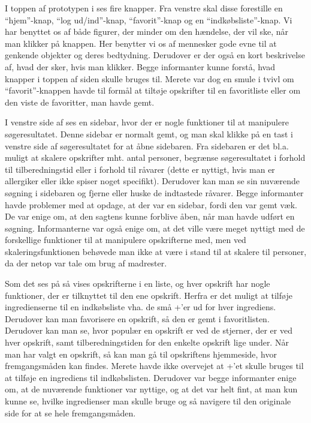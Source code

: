 I toppen af prototypen i  ses fire knapper. Fra venstre skal disse forestille en ``hjem''-knap, ``log ud/ind''-knap, ``favorit''-knap og en ``indkøbsliste''-knap. Vi har benyttet os af både figurer, der minder om den hændelse, der vil ske, når man klikker på knappen. Her benytter vi os af mennesker gode evne til at genkende objekter og deres bedtydning.\cite[p. ~340]{deb} Derudover er der også en kort beskrivelse af, hvad der sker, hvis man klikker. Begge informanter kunne forstå, hvad knapper i toppen af siden skulle bruges til. Merete var dog en smule i tvivl om ``favorit''-knappen havde til formål at tiltøje opskrifter til en favoritliste eller om den viste de favoritter, man havde gemt.

I venstre side af  ses en sidebar, hvor der er nogle funktioner til at manipulere søgeresultatet. Denne sidebar er normalt gemt, og man skal klikke på en tast i venstre side af søgeresultatet for at åbne sidebaren. Fra sidebaren er det bl.a. muligt at skalere opskrifter mht. antal personer, begrænse søgeresultatet i forhold til tilberedningstid eller i forhold til råvarer (dette er nyttigt, hvis man \fx er allergiker eller ikke spiser noget specifikt). Derudover kan man se sin nuværende søgning i sidebaren og fjerne eller huske de indtastede råvarer. Begge informanter havde problemer med at opdage, at der var en sidebar, fordi den var gemt væk. De var enige om, at den sagtens kunne forblive åben, når man havde udført en søgning. Informanterne var også enige om, at det ville være meget nyttigt med de forskellige funktioner til at manipulere opskrifterne med, men \fx ved skaleringsfunktionen behøvede man ikke at være i stand til at skalere til  personer, da der netop var tale om brug af madrester. 

Som det ses på  så vises opskrifterne i en liste, og hver opskrift har nogle funktioner, der er tilknyttet til den ene opskrift. Herfra er det muligt at tilføje ingredienserne til en indkøbsliste vha. de små +'er ud for hver ingrediens. Derudover kan man favorisere en opskrift, så den er gemt i favoritlisten. Derudover kan man se, hvor populær en opskrift er ved de stjerner, der er ved hver opskrift, samt tilberedningstiden for den enkelte opskrift lige under. Når man har valgt en opskrift, så kan man gå til opskriftens hjemmeside, hvor fremgangsmåden kan findes. Merete havde ikke overvejet at +'et skulle bruges til at tilføje en ingrediens til indkøbslisten. Derudover var begge informanter enige om, at de nuværende funktioner var nyttige, og at det var helt fint, at man kun kunne se, hvilke ingredienser man skulle bruge og så navigere til den originale side for at se hele fremgangsmåden.

